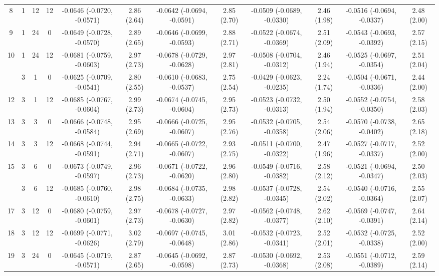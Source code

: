 \begin{table}[!h]
{\begin{tabular}[t]{cccccccccccc}
8 & 1 & 12 & 12 & -0.0646 (-0.0720, -0.0571) & 2.86 (2.64) & -0.0642 (-0.0694, -0.0591) & 2.85 (2.70) & -0.0509 (-0.0689, -0.0330) & 2.46 (1.98) & -0.0516 (-0.0694, -0.0337) & 2.48 (2.00)\\
9 & 1 & 24 & 0 & -0.0649 (-0.0728, -0.0570) & 2.89 (2.65) & -0.0646 (-0.0699, -0.0593) & 2.88 (2.71) & -0.0522 (-0.0674, -0.0369) & 2.51 (2.09) & -0.0543 (-0.0693, -0.0392) & 2.57 (2.15)\\
10 & 1 & 24 & 12 & -0.0681 (-0.0759, -0.0603) & 2.97 (2.73) & -0.0678 (-0.0729, -0.0628) & 2.97 (2.81) & -0.0508 (-0.0704, -0.0312) & 2.46 (1.94) & -0.0525 (-0.0697, -0.0354) & 2.51 (2.04)\\
\addlinespace
11 & 3 & 1 & 0 & -0.0625 (-0.0709, -0.0541) & 2.80 (2.55) & -0.0610 (-0.0683, -0.0537) & 2.75 (2.54) & -0.0429 (-0.0623, -0.0235) & 2.24 (1.74) & -0.0504 (-0.0671, -0.0336) & 2.44 (2.00)\\
12 & 3 & 1 & 12 & -0.0685 (-0.0767, -0.0604) & 2.99 (2.73) & -0.0674 (-0.0745, -0.0604) & 2.95 (2.73) & -0.0523 (-0.0732, -0.0313) & 2.50 (1.94) & -0.0552 (-0.0754, -0.0350) & 2.58 (2.03)\\
13 & 3 & 3 & 0 & -0.0666 (-0.0748, -0.0584) & 2.95 (2.69) & -0.0666 (-0.0725, -0.0607) & 2.95 (2.76) & -0.0532 (-0.0705, -0.0358) & 2.54 (2.06) & -0.0570 (-0.0738, -0.0402) & 2.65 (2.18)\\
14 & 3 & 3 & 12 & -0.0668 (-0.0744, -0.0591) & 2.94 (2.71) & -0.0665 (-0.0722, -0.0607) & 2.93 (2.75) & -0.0511 (-0.0700, -0.0322) & 2.47 (1.96) & -0.0527 (-0.0717, -0.0337) & 2.52 (2.00)\\
15 & 3 & 6 & 0 & -0.0673 (-0.0749, -0.0597) & 2.96 (2.73) & -0.0671 (-0.0722, -0.0620) & 2.96 (2.80) & -0.0549 (-0.0716, -0.0382) & 2.58 (2.12) & -0.0521 (-0.0694, -0.0347) & 2.50 (2.03)\\
\addlinespace
16 & 3 & 6 & 12 & -0.0685 (-0.0760, -0.0610) & 2.98 (2.75) & -0.0684 (-0.0735, -0.0633) & 2.98 (2.82) & -0.0537 (-0.0728, -0.0345) & 2.54 (2.02) & -0.0540 (-0.0716, -0.0364) & 2.55 (2.07)\\
17 & 3 & 12 & 0 & -0.0680 (-0.0759, -0.0601) & 2.97 (2.73) & -0.0678 (-0.0727, -0.0630) & 2.97 (2.82) & -0.0562 (-0.0748, -0.0377) & 2.62 (2.10) & -0.0569 (-0.0747, -0.0391) & 2.64 (2.14)\\
18 & 3 & 12 & 12 & -0.0699 (-0.0771, -0.0626) & 3.02 (2.79) & -0.0697 (-0.0745, -0.0648) & 3.01 (2.86) & -0.0532 (-0.0723, -0.0341) & 2.52 (2.01) & -0.0532 (-0.0725, -0.0338) & 2.52 (2.00)\\
19 & 3 & 24 & 0 & -0.0645 (-0.0719, -0.0571) & 2.87 (2.65) & -0.0645 (-0.0692, -0.0598) & 2.87 (2.73) & -0.0530 (-0.0692, -0.0368) & 2.53 (2.08) & -0.0551 (-0.0712, -0.0389) & 2.59 (2.14)\\

\end{tabular}}
\end{table}

